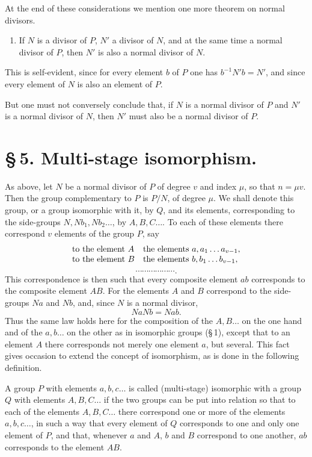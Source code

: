 \documentclass[11pt]{article}
\begin{document}
At the end of these considerations we mention one more theorem on normal divisors.
\begin{enumerate}[resume,label=\arabic*.]
\item If $N$ is a divisor of $P$, $N'$ a divisor of $N$, and at the same time a normal divisor of $P$, then $N'$ is also a normal divisor of $N$.
\end{enumerate}
This is self-evident, since for every element $b$ of $P$ one has $b^{-1}N'b=N'$, and since every element of $N$ is also an element of $P$.

But one must not conversely conclude that, if $N$ is a normal divisor of $P$ and $N'$ is a normal divisor of $N$, then $N'$ must also be a normal divisor of $P$.

\section*{\S\,5. Multi-stage isomorphism.}

As above, let $N$ be a normal divisor of $P$ of degree $v$ and index $\mu$, so that $n=\mu v$. Then the group complementary to $P$ is $P/N$, of degree $\mu$. We shall denote this group, or a group isomorphic with it, by $Q$, and its elements, corresponding to the side-groups $N,Nb_1,Nb_2\ldots$, by $A,B,C\ldots$. To each of these elements there correspond $v$ elements of the group $P$, say
\[
\begin{array}{ll}
\hbox{to the element } A & \hbox{the elements } a,a_1\ldots a_{v-1},\\
\hbox{to the element } B & \hbox{the elements } b,b_1\ldots b_{v-1},
\end{array}
\]
\[
\cdots\cdots\cdots\cdots\cdots\cdots.
\]
This correspondence is then such that every composite element $ab$ corresponds to the composite element $AB$. For the elements $A$ and $B$ correspond to the side-groups $Na$ and $Nb$, and, since $N$ is a normal divisor,
\[
NaNb=Nab.
\]
Thus the same law holds here for the composition of the $A,B\ldots$ on the one hand and of the $a,b\ldots$ on the other as in isomorphic groups (\S\,1), except that to an element $A$ there corresponds not merely one element $a$, but several. This fact gives occasion to extend the concept of isomorphism, as is done in the following definition.

A group $P$ with elements $a,b,c\ldots$ is called (multi-stage) isomorphic with a group $Q$ with elements $A,B,C\ldots$ if the two groups can be put into relation so that to each of the elements $A,B,C\ldots$ there correspond one or more of the elements $a,b,c\ldots$, in such a way that every element of $Q$ corresponds to one and only one element of $P$, and that, whenever $a$ and $A$, $b$ and $B$ correspond to one another, $ab$ corresponds to the element $AB$.
\end{document}
